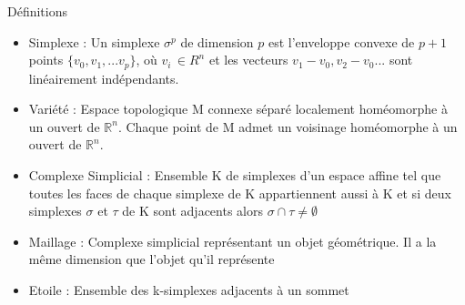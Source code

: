 \documentclass[9pt]{beamer}
\begin{document}
\begin{frame}
\begin{block}{Définitions}
\begin{itemize}
\item Simplexe : Un simplexe $\sigma^p$ de dimension $p$ est l'enveloppe convexe de $p+1$ points $\{v_0,v_1,...v_p\}$, où $v_i\, \in R^n$ et les vecteurs $v_1-v_0,v_2-v_0...$ sont linéairement indépendants. 
\item Variété  : Espace topologique M connexe séparé localement homéomorphe à un ouvert de $\mathbb{R}^n$. Chaque point de M admet un voisinage homéomorphe à un ouvert de $\mathbb{R}^n$.
\item Complexe Simplicial : Ensemble K de simplexes d'un espace affine tel que toutes les faces de chaque simplexe de K appartiennent aussi à K et si deux simplexes $\sigma$ et $\tau$ de K sont adjacents alors $\sigma \cap \tau \neq \emptyset$
\item Maillage : Complexe simplicial représentant un objet géométrique. Il a la même dimension que l'objet qu'il représente
\item Etoile : Ensemble des k-simplexes adjacents à un sommet
\end{itemize}
\end{block}
\end{frame}
\end{document}
